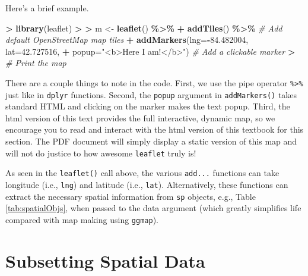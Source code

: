 \documentclass[
]{krantz}
\makeatletter
\newenvironment{Shaded}{\begin{snugshade}}{\end{snugshade}}
\newcommand{\CommentTok}[1]{\textcolor[rgb]{0.37,0.37,0.37}{\textit{#1}}}
\newcommand{\DataTypeTok}[1]{\textcolor[rgb]{0.27,0.27,0.27}{#1}}
\newcommand{\ErrorTok}[1]{\textcolor[rgb]{0.14,0.14,0.14}{\textbf{#1}}}
\newcommand{\FloatTok}[1]{\textcolor[rgb]{0.06,0.06,0.06}{#1}}
\newcommand{\KeywordTok}[1]{\textcolor[rgb]{0.27,0.27,0.27}{\textbf{#1}}}
\newcommand{\NormalTok}[1]{#1}
\newcommand{\OperatorTok}[1]{\textcolor[rgb]{0.43,0.43,0.43}{\textbf{#1}}}
\newcommand{\StringTok}[1]{\textcolor[rgb]{0.5,0.5,0.5}{#1}}
\newenvironment{kframe}{%
\medskip{}
\setlength{\fboxsep}{.8em}
 \def\at@end@of@kframe{}%
 \ifinner\ifhmode%
  \def\at@end@of@kframe{\end{minipage}}%
  \begin{minipage}{\columnwidth}%
 \fi\fi%
 \def\FrameCommand##1{\hskip\@totalleftmargin \hskip-\fboxsep
 \colorbox{shadecolor}{##1}\hskip-\fboxsep
     \hskip-\linewidth \hskip-\@totalleftmargin \hskip\columnwidth}%
 \MakeFramed {\advance\hsize-\width
   \@totalleftmargin\z@ \linewidth\hsize
   \@setminipage}}%
 {\par\unskip\endMakeFramed%
 \at@end@of@kframe}
\renewenvironment{Shaded}{\begin{kframe}}{\end{kframe}}
\makeatother
\begin{document}
Here's a brief example.

\begin{Shaded}
\begin{Highlighting}[]
\OperatorTok{\textgreater{}}\StringTok{ }\KeywordTok{library}\NormalTok{(leaflet)}
\OperatorTok{\textgreater{}}\StringTok{ }
\ErrorTok{\textgreater{}}\StringTok{ }\NormalTok{m \textless{}{-}}\StringTok{ }\KeywordTok{leaflet}\NormalTok{() }\OperatorTok{\%\textgreater{}\%}
\OperatorTok{+}\StringTok{       }\KeywordTok{addTiles}\NormalTok{() }\OperatorTok{\%\textgreater{}\%}\StringTok{  }\CommentTok{\# Add default OpenStreetMap map tiles}
\OperatorTok{+}\StringTok{       }\KeywordTok{addMarkers}\NormalTok{(}\DataTypeTok{lng=}\OperatorTok{{-}}\FloatTok{84.482004}\NormalTok{, }\DataTypeTok{lat=}\FloatTok{42.727516}\NormalTok{, }
\OperatorTok{+}\StringTok{                  }\DataTypeTok{popup=}\StringTok{"\textless{}b\textgreater{}Here I am!\textless{}/b\textgreater{}"}\NormalTok{) }\CommentTok{\# Add a clickable marker}
\OperatorTok{\textgreater{}}\StringTok{       }\CommentTok{\# Print the map}
\end{Highlighting}
\end{Shaded}

There are a couple things to note in the code. First, we use the pipe operator \texttt{\%\textgreater{}\%} just like in \texttt{dplyr} functions. Second, the \texttt{popup} argument in \texttt{addMarkers()} takes standard HTML and clicking on the marker makes the text popup. Third, the html version of this text provides the full interactive, dynamic map, so we encourage you to read and interact with the html version of this textbook for this section. The PDF document will simply display a static version of this map and will not do justice to how awesome \texttt{leaflet} truly is!

As seen in the \texttt{leaflet()} call above, the various \texttt{add...} functions can take longitude (i.e., \texttt{lng}) and latitude (i.e., \texttt{lat}). Alternatively, these functions can extract the necessary spatial information from \texttt{sp} objects, e.g., Table \ref{tab:spatialObjs}, when passed to the data argument (which greatly simplifies life compared with map making using \texttt{ggmap}).

\hypertarget{subsetting-spatial-data}{%
\section{Subsetting Spatial Data}\label{subsetting-spatial-data}}
\end{document}
